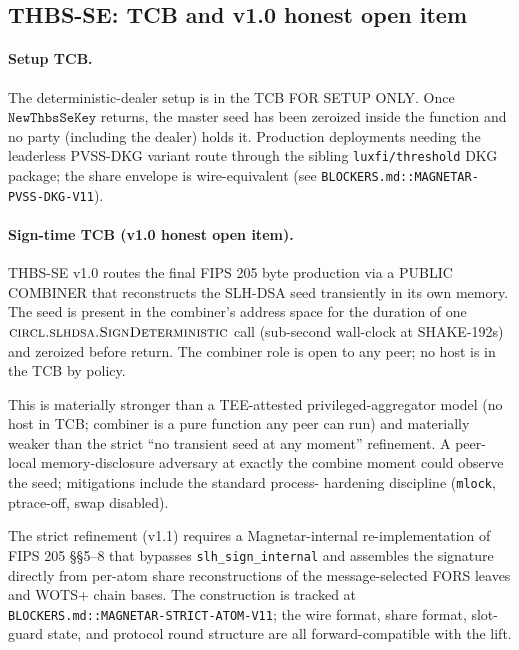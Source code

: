 \subsection{THBS-SE: TCB and v1.0 honest open item}
\label{sec:security:thbsse-tcb}

\paragraph{Setup TCB.} The deterministic-dealer setup is in the
TCB FOR SETUP ONLY. Once $\texttt{NewThbsSeKey}$ returns, the
master seed has been zeroized inside the function and no party
(including the dealer) holds it. Production deployments needing
the leaderless PVSS-DKG variant route through the sibling
\texttt{luxfi/threshold} DKG package; the share envelope is
wire-equivalent (see
\texttt{BLOCKERS.md::MAGNETAR-PVSS-DKG-V11}).

\paragraph{Sign-time TCB (v1.0 honest open item).} THBS-SE
v1.0 routes the final FIPS 205 byte production via a PUBLIC
COMBINER that reconstructs the SLH-DSA seed transiently in its
own memory. The seed is present in the combiner's address space
for the duration of one
$\textsc{circl.slhdsa.SignDeterministic}$ call (sub-second
wall-clock at SHAKE-192s) and zeroized before return. The
combiner role is open to any peer; no host is in the TCB by
policy.

This is materially stronger than a TEE-attested
privileged-aggregator model (no host in TCB; combiner is a pure
function any peer can run) and materially weaker than the strict
``no transient seed at any moment'' refinement. A peer-local
memory-disclosure adversary at exactly the combine moment could
observe the seed; mitigations include the standard process-
hardening discipline (\texttt{mlock}, ptrace-off, swap
disabled).

The strict refinement (v1.1) requires a Magnetar-internal
re-implementation of FIPS 205 \S\S 5--8 that bypasses
\texttt{slh\_sign\_internal} and assembles the signature
directly from per-atom share reconstructions of the
message-selected FORS leaves and WOTS+ chain bases. The
construction is tracked at
\texttt{BLOCKERS.md::MAGNETAR-STRICT-ATOM-V11}; the wire format,
share format, slot-guard state, and protocol round structure
are all forward-compatible with the lift.

